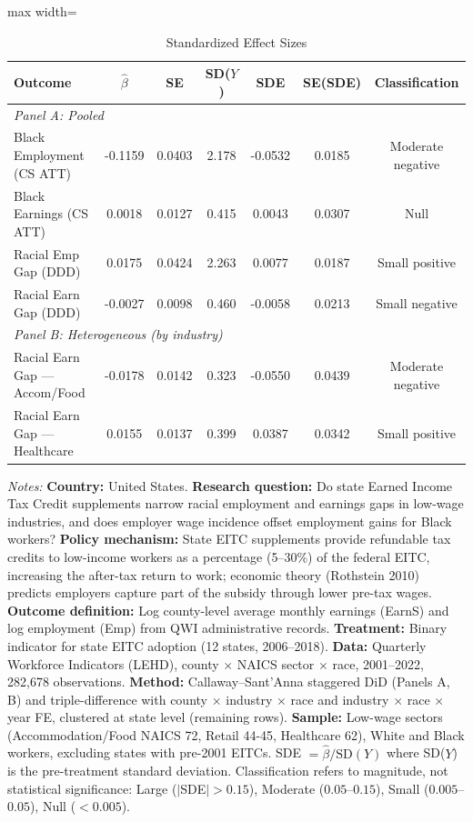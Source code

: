\begin{table}[htbp]
\centering
\caption{Standardized Effect Sizes}
\label{tab:sde}
\begin{adjustbox}{max width=\textwidth}
\begin{tabular}{lcccccc}
\toprule
Outcome & $\hat{\beta}$ & SE & SD($Y$) & SDE & SE(SDE) & Classification \\
\midrule
\multicolumn{7}{l}{\textit{Panel A: Pooled}} \\
Black Employment (CS ATT) & -0.1159 & 0.0403 & 2.178 & -0.0532 & 0.0185 & Moderate negative \\
Black Earnings (CS ATT) & 0.0018 & 0.0127 & 0.415 & 0.0043 & 0.0307 & Null \\
Racial Emp Gap (DDD) & 0.0175 & 0.0424 & 2.263 & 0.0077 & 0.0187 & Small positive \\
Racial Earn Gap (DDD) & -0.0027 & 0.0098 & 0.460 & -0.0058 & 0.0213 & Small negative \\
\midrule
\multicolumn{7}{l}{\textit{Panel B: Heterogeneous (by industry)}} \\
Racial Earn Gap — Accom/Food & -0.0178 & 0.0142 & 0.323 & -0.0550 & 0.0439 & Moderate negative \\
Racial Earn Gap — Healthcare & 0.0155 & 0.0137 & 0.399 & 0.0387 & 0.0342 & Small positive \\
\bottomrule
\end{tabular}
\end{adjustbox}
\begin{tablenotes}
\item \textit{Notes:} \textbf{Country:} United States. \textbf{Research question:} Do state Earned Income Tax Credit supplements narrow racial employment and earnings gaps in low-wage industries, and does employer wage incidence offset employment gains for Black workers? \textbf{Policy mechanism:} State EITC supplements provide refundable tax credits to low-income workers as a percentage (5--30\%) of the federal EITC, increasing the after-tax return to work; economic theory (Rothstein 2010) predicts employers capture part of the subsidy through lower pre-tax wages. \textbf{Outcome definition:} Log county-level average monthly earnings (EarnS) and log employment (Emp) from QWI administrative records. \textbf{Treatment:} Binary indicator for state EITC adoption (12 states, 2006--2018). \textbf{Data:} Quarterly Workforce Indicators (LEHD), county $\times$ NAICS sector $\times$ race, 2001--2022, 282,678 observations. \textbf{Method:} Callaway--Sant'Anna staggered DiD (Panels A, B) and triple-difference with county $\times$ industry $\times$ race and industry $\times$ race $\times$ year FE, clustered at state level (remaining rows). \textbf{Sample:} Low-wage sectors (Accommodation/Food NAICS 72, Retail 44-45, Healthcare 62), White and Black workers, excluding states with pre-2001 EITCs. SDE $= \hat{\beta} / \text{SD}(Y)$ where SD($Y$) is the pre-treatment standard deviation. Classification refers to magnitude, not statistical significance: Large ($|$SDE$| > 0.15$), Moderate ($0.05$--$0.15$), Small ($0.005$--$0.05$), Null ($< 0.005$).
\end{tablenotes}
\end{table}


